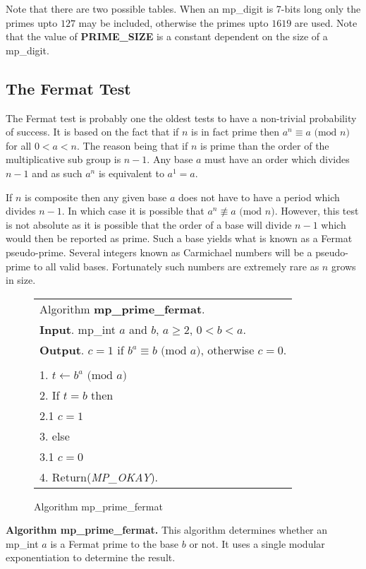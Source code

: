 \documentclass[b5paper]{book}
\def\nequiv{\not\equiv}
\begin{document}
Note that there are two possible tables.  When an mp\_digit is 7-bits long only the primes upto $127$ may be included, otherwise the primes
upto $1619$ are used.  Note that the value of \textbf{PRIME\_SIZE} is a constant dependent on the size of a mp\_digit. 

\subsection{The Fermat Test}
The Fermat test is probably one the oldest tests to have a non-trivial probability of success.  It is based on the fact that if $n$ is in 
fact prime then $a^{n} \equiv a \mbox{ (mod }n\mbox{)}$ for all $0 < a < n$.  The reason being that if $n$ is prime than the order of
the multiplicative sub group is $n - 1$.  Any base $a$ must have an order which divides $n - 1$ and as such $a^n$ is equivalent to 
$a^1 = a$.  

If $n$ is composite then any given base $a$ does not have to have a period which divides $n - 1$.  In which case 
it is possible that $a^n \nequiv a \mbox{ (mod }n\mbox{)}$.  However, this test is not absolute as it is possible that the order
of a base will divide $n - 1$ which would then be reported as prime.  Such a base yields what is known as a Fermat pseudo-prime.  Several 
integers known as Carmichael numbers will be a pseudo-prime to all valid bases.  Fortunately such numbers are extremely rare as $n$ grows
in size.

\begin{figure}[!here]
\begin{small}
\begin{center}
\begin{tabular}{l}
\hline Algorithm \textbf{mp\_prime\_fermat}. \\
\textbf{Input}.   mp\_int $a$ and $b$, $a \ge 2$, $0 < b < a$.  \\
\textbf{Output}.  $c = 1$ if $b^a \equiv b \mbox{ (mod }a\mbox{)}$, otherwise $c = 0$.  \\
\hline \\
1.  $t \leftarrow b^a \mbox{ (mod }a\mbox{)}$ \\
2.  If $t = b$ then \\
\hspace{3mm}2.1  $c = 1$ \\
3.  else \\
\hspace{3mm}3.1  $c = 0$ \\
4.  Return(\textit{MP\_OKAY}). \\
\hline
\end{tabular}
\end{center}
\end{small}
\caption{Algorithm mp\_prime\_fermat}
\end{figure}
\textbf{Algorithm mp\_prime\_fermat.}
This algorithm determines whether an mp\_int $a$ is a Fermat prime to the base $b$ or not.  It uses a single modular exponentiation to
determine the result.  
\end{document}
